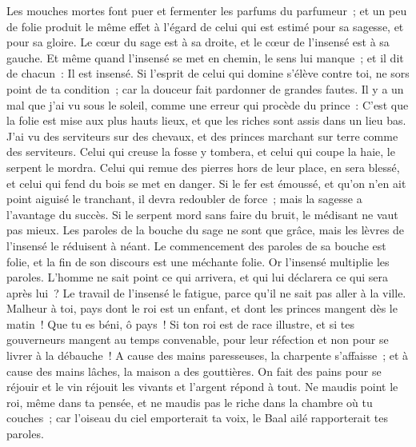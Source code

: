 \begin{multicols}{2}
\VerseOne{} Les mouches mortes font puer et fermenter les parfums du parfumeur~; et un peu de folie produit le même effet à l'égard de celui qui est estimé pour sa sagesse, et pour sa gloire.
Le cœur du sage est à sa droite, et le cœur de l'insensé est à sa gauche.
Et même quand l'insensé se met en chemin, le sens lui manque~; et il dit de chacun~: Il est insensé. 
Si l'esprit de celui qui domine s'élève contre toi, ne sors point de ta condition~; car la douceur fait pardonner de grandes fautes. 
Il y a un mal que j'ai vu sous le soleil, comme une erreur qui procède du prince~:
C'est que la folie est mise aux plus hauts lieux, et que les riches sont assis dans un lieu bas. 
J'ai vu des serviteurs sur des chevaux, et des princes marchant sur terre comme des serviteurs.
Celui qui creuse la fosse y tombera, et celui qui coupe la haie, le serpent le mordra.
Celui qui remue des pierres hors de leur place, en sera blessé, et celui qui fend du bois se met en danger.
Si le fer est émoussé, et qu'on n'en ait point aiguisé le tranchant, il devra redoubler de force~; mais la sagesse a l'avantage du succès.
Si le serpent mord sans faire du bruit, le médisant ne vaut pas mieux. 
Les paroles de la bouche du sage ne sont que grâce, mais les lèvres de l'insensé le réduisent à néant.
Le commencement des paroles de sa bouche est folie, et la fin de son discours est une méchante folie.
Or l'insensé multiplie les paroles. L'homme ne sait point ce qui arrivera, et qui lui déclarera ce qui sera après lui~?
Le travail de l'insensé le fatigue, parce qu'il ne sait pas aller à la ville.
Malheur à toi, pays dont le roi est un enfant, et dont les princes mangent dès le matin~!
Que tu es béni, ô pays~! Si ton roi est de race illustre, et si tes gouverneurs mangent au temps convenable, pour leur réfection et non pour se livrer à la débauche~! 
A cause des mains paresseuses, la charpente s'affaisse~; et à cause des mains lâches, la maison a des gouttières.
On fait des pains pour se réjouir et le vin réjouit les vivants et l'argent répond à tout.
Ne maudis point le roi, même dans ta pensée, et ne maudis pas le riche dans la chambre où tu couches~; car l'oiseau du ciel emporterait ta voix, le Baal ailé rapporterait tes paroles.

\end{multicols}
